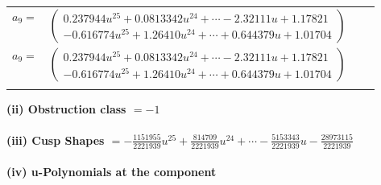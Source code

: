 \documentclass[1p]{elsarticle_modified}
\theoremstyle{definition}
\begin{document}
\begin{tabular}{m{7pt} m{180pt} m{7pt} m{180pt} }
\flushright $a_{9}=$&$\begin{pmatrix}0.237944 u^{25}+0.0813342 u^{24}+\cdots-2.32111 u+1.17821\\-0.616774 u^{25}+1.26410 u^{24}+\cdots+0.644379 u+1.01704\end{pmatrix}$\\ \flushright $a_{9}=$&$\begin{pmatrix}0.237944 u^{25}+0.0813342 u^{24}+\cdots-2.32111 u+1.17821\\-0.616774 u^{25}+1.26410 u^{24}+\cdots+0.644379 u+1.01704\end{pmatrix}$\\&\end{tabular}
\flushleft \textbf{(ii) Obstruction class $= -1$}\\~\\
\flushleft \textbf{(iii) Cusp Shapes $= -\frac{1151955}{2221939} u^{25}+\frac{814709}{2221939} u^{24}+\cdots-\frac{5153343}{2221939} u-\frac{28973115}{2221939}$}\\~\\
\newpage\renewcommand{\arraystretch}{1}
\flushleft \textbf{(iv) u-Polynomials at the component}\newline \\
\end{document}
